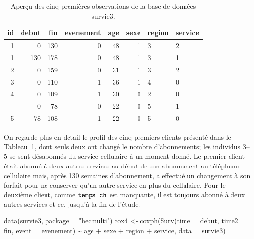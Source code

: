 \documentclass[
  11pt,
  letterpaper,
]{book}
\newenvironment{Shaded}{\begin{snugshade}}{\end{snugshade}}
\newcommand{\AttributeTok}[1]{\textcolor[rgb]{0.40,0.45,0.13}{#1}}
\newcommand{\FunctionTok}[1]{\textcolor[rgb]{0.28,0.35,0.67}{#1}}
\newcommand{\NormalTok}[1]{\textcolor[rgb]{0.00,0.23,0.31}{#1}}
\newcommand{\OtherTok}[1]{\textcolor[rgb]{0.00,0.23,0.31}{#1}}
\newcommand{\SpecialCharTok}[1]{\textcolor[rgb]{0.37,0.37,0.37}{#1}}
\newcommand{\StringTok}[1]{\textcolor[rgb]{0.13,0.47,0.30}{#1}}
\theoremstyle{definition}
\theoremstyle{remark}
\begin{document}
\hypertarget{tbl-survie3-donnees}{}
\begin{table}
\caption{\label{tbl-survie3-donnees}Aperçu des cinq premières observations de la base de données survie3. }\tabularnewline

\centering
\begin{tabular}{rrrrrrll}
\toprule
id & debut & fin & evenement & age & sexe & region & service\\
\midrule
1 & 0 & 130 & 0 & 48 & 1 & 3 & 2\\
1 & 130 & 178 & 0 & 48 & 1 & 3 & 1\\
2 & 0 & 159 & 0 & 31 & 1 & 3 & 2\\
3 & 0 & 110 & 1 & 36 & 1 & 4 & 0\\
4 & 0 & 109 & 1 & 30 & 0 & 2 & 0\\
\addlinespace
5 & 0 & 78 & 0 & 22 & 0 & 5 & 1\\
5 & 78 & 108 & 1 & 22 & 0 & 5 & 0\\
\bottomrule
\end{tabular}
\end{table}

On regarde plus en détail le profil des cinq premiers clients présenté
dans le Tableau~\ref{tbl-survie3-donnees}, dont seuls deux ont changé le
nombre d'abonnements; les individus 3--5 se sont désabonnés du service
cellulaire à un moment donné. Le premier client était abonné à deux
autres services au début de son abonnement au téléphone cellulaire mais,
après 130 semaines d'abonnement, a effectué un changement à son forfait
pour ne conserver qu'un autre service en plus du cellulaire. Pour le
deuxième client, comme \(\verb+temps_ch+\) est manquante, il est
toujours abonné à deux autres services et ce, jusqu'à la fin de l'étude.

\begin{Shaded}
\begin{Highlighting}[]
\FunctionTok{data}\NormalTok{(survie3, }\AttributeTok{package =} \StringTok{"hecmulti"}\NormalTok{)}
\NormalTok{cox4 }\OtherTok{\textless{}{-}} \FunctionTok{coxph}\NormalTok{(}\FunctionTok{Surv}\NormalTok{(}\AttributeTok{time =}\NormalTok{ debut, }
                   \AttributeTok{time2 =}\NormalTok{ fin, }
                   \AttributeTok{event =}\NormalTok{ evenement) }\SpecialCharTok{\textasciitilde{}} 
\NormalTok{                age }\SpecialCharTok{+}\NormalTok{ sexe }\SpecialCharTok{+}\NormalTok{ region }\SpecialCharTok{+}\NormalTok{ service, }
              \AttributeTok{data =}\NormalTok{ survie3)}
\end{Highlighting}
\end{Shaded}
\end{document}
